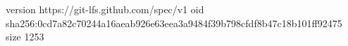 version https://git-lfs.github.com/spec/v1
oid sha256:0cd7a82c70244a16aeab926e63eea3a9484f39b798cfdf8b47c18b101ff92475
size 1253
